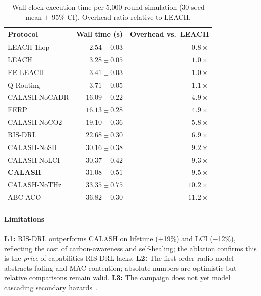 \documentclass[12pt, onecolumn, journal]{IEEEtran}
\begin{document}
\begin{table}[!t]
\centering
\caption{Wall-clock execution time per 5{,}000-round simulation (30-seed mean $\pm$ 95\% CI). Overhead ratio relative to LEACH.}
\label{tab:execution_time}
\begin{tabular}{lrr}
\toprule
Protocol & Wall time (s) & Overhead vs.\ LEACH \\
\midrule
LEACH-1hop     & $2.54 \pm 0.03$ & $0.8\times$ \\
LEACH          & $3.28 \pm 0.05$ & $1.0\times$ \\
EE-LEACH       & $3.41 \pm 0.03$ & $1.0\times$ \\
Q-Routing      & $3.71 \pm 0.05$ & $1.1\times$ \\
CALASH-NoCADR  & $16.09 \pm 0.22$ & $4.9\times$ \\
EERP           & $16.13 \pm 0.28$ & $4.9\times$ \\
CALASH-NoCO2   & $19.10 \pm 0.36$ & $5.8\times$ \\
RIS-DRL        & $22.68 \pm 0.30$ & $6.9\times$ \\
CALASH-NoSH    & $30.16 \pm 0.38$ & $9.2\times$ \\
CALASH-NoLCI   & $30.37 \pm 0.42$ & $9.3\times$ \\
\textbf{CALASH}& $\mathbf{31.08 \pm 0.51}$ & $\mathbf{9.5\times}$ \\
CALASH-NoTHz   & $33.35 \pm 0.75$ & $10.2\times$ \\
ABC-ACO        & $36.82 \pm 0.30$ & $11.2\times$ \\
\bottomrule
\end{tabular}
\end{table}

\paragraph{Limitations}
\textbf{L1:} RIS-DRL outperforms CALASH on lifetime ($+$19\%) and LCI ($-$12\%), reflecting the cost of carbon-awareness and self-healing; the ablation confirms this is the \emph{price} of capabilities RIS-DRL lacks.
\textbf{L2:} The first-order radio model abstracts fading and MAC contention; absolute numbers are optimistic but relative comparisons remain valid.
\textbf{L3:} The campaign does not yet model cascading secondary hazards~\cite{utsu1995omori}.

\FloatBarrier
\end{document}
